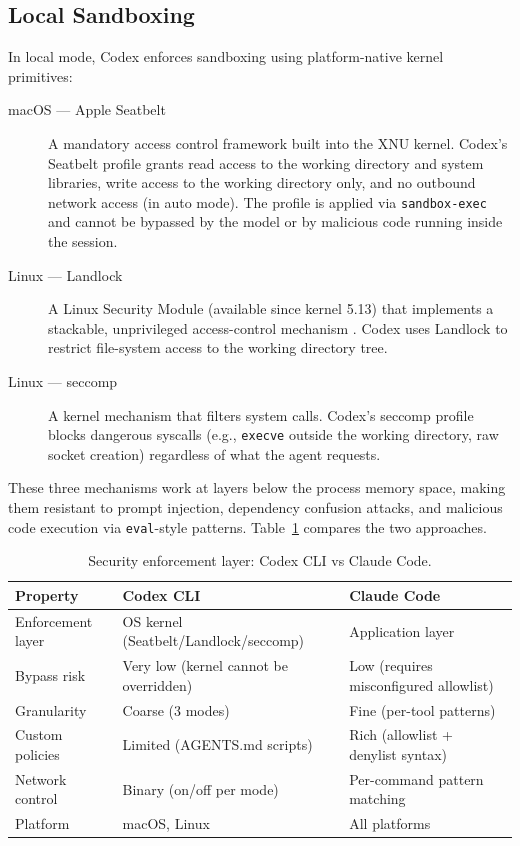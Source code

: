 \subsection{Local Sandboxing}
\label{app:codex:local-sandbox}

In local mode, Codex enforces sandboxing using platform-native kernel
primitives:

\begin{description}
  \item[macOS --- Apple Seatbelt] A mandatory access control framework built
        into the XNU kernel.  Codex's Seatbelt profile grants read access to
        the working directory and system libraries, write access to the working
        directory only, and no outbound network access (in auto mode).  The
        profile is applied via \texttt{sandbox-exec} and cannot be bypassed by
        the model or by malicious code running inside the session.

  \item[Linux --- Landlock] A Linux Security Module (available since kernel
        5.13) that implements a stackable, unprivileged access-control
        mechanism \citep{linux2022landlock}.  Codex uses Landlock to restrict
        file-system access to the working directory tree.

  \item[Linux --- seccomp] A kernel mechanism that filters system calls.
        Codex's seccomp profile blocks dangerous syscalls (e.g.,
        \texttt{execve} outside the working directory, raw socket creation)
        regardless of what the agent requests.
\end{description}

These three mechanisms work at layers below the process memory space, making
them resistant to prompt injection, dependency confusion attacks, and malicious
code execution via \texttt{eval}-style patterns.  Table~\ref{tab:sandbox-compare}
compares the two approaches.

\begin{table}[ht]
\centering
\caption{Security enforcement layer: Codex CLI vs Claude Code.}
\label{tab:sandbox-compare}
\begin{tabular}{lll}
\toprule
\textbf{Property} & \textbf{Codex CLI} & \textbf{Claude Code} \\
\midrule
Enforcement layer      & OS kernel (Seatbelt/Landlock/seccomp) & Application layer \\
Bypass risk            & Very low (kernel cannot be overridden) & Low (requires misconfigured allowlist) \\
Granularity            & Coarse (3 modes)  & Fine (per-tool patterns) \\
Custom policies        & Limited (AGENTS.md scripts) & Rich (allowlist + denylist syntax) \\
Network control        & Binary (on/off per mode) & Per-command pattern matching \\
Platform               & macOS, Linux      & All platforms \\
\bottomrule
\end{tabular}
\end{table}

